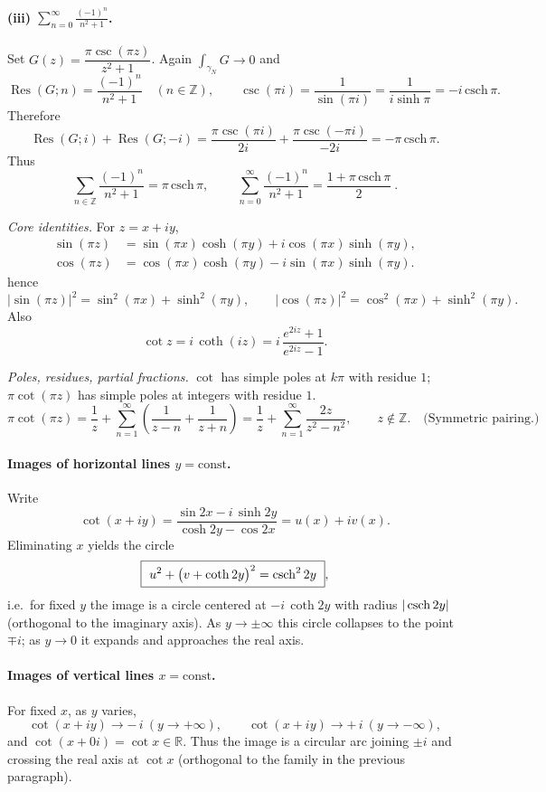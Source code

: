 \begin{problem}[CP-IV-0137]
\medskip
\paragraph{(iii) $\displaystyle \sum_{n=0}^{\infty}\frac{(-1)^{n}}{n^{2}+1}$.}
Set $G(z)=\dfrac{\pi\csc(\pi z)}{z^{2}+1}$.
Again $\int_{\gamma_N}G\to0$ and
\[
\operatorname{Res}(G;n)=\frac{(-1)^{n}}{n^{2}+1}\quad(n\in\mathbb Z),
\qquad
\csc(\pi i)=\frac{1}{\sin(\pi i)}=\frac{1}{i\sinh\pi}=-i\,\mathrm{csch}\,\pi.
\]
Therefore
\[
\operatorname{Res}(G;i)+\operatorname{Res}(G;-i)
=\frac{\pi\csc(\pi i)}{2i}+\frac{\pi\csc(-\pi i)}{-2i}
=-\pi\,\mathrm{csch}\,\pi.
\]
Thus
\[
\sum_{n\in\mathbb Z}\frac{(-1)^{n}}{n^{2}+1}
=\pi\,\mathrm{csch}\,\pi,
\qquad
\boxed{\ \sum_{n=0}^{\infty}\frac{(-1)^{n}}{n^{2}+1}
	=\frac{1+\pi\,\mathrm{csch}\,\pi}{2}\ }.
\]


\emph{Core identities.} For $z=x+iy$,
\[
\begin{aligned}
\sin(\pi z)&=\sin(\pi x)\cosh(\pi y)
+i\cos(\pi x)\sinh(\pi y),\\
\cos(\pi z)&=\cos(\pi x)\cosh(\pi y)
-i\sin(\pi x)\sinh(\pi y).
\end{aligned}
\]
hence
\[
|\sin(\pi z)|^2=\sin^2(\pi x)+\sinh^2(\pi y),\qquad
|\cos(\pi z)|^2=\cos^2(\pi x)+\sinh^2(\pi y).
\]
Also
\[
\cot z=i\,\coth(iz)=i\,\frac{e^{2iz}+1}{e^{2iz}-1}.
\]

\emph{Poles, residues, partial fractions.}
$\cot$ has simple poles at $k\pi$ with residue $1$; $\pi\cot(\pi z)$ has simple poles at integers with residue $1$.
\[
\pi\cot(\pi z)=\frac1z+\sum_{n=1}^{\infty}\left(\frac1{z-n}+\frac1{z+n}\right)=\frac1z+\sum_{n=1}^{\infty}\frac{2z}{z^2-n^2},\qquad z\notin\mathbb Z.\quad\text{(Symmetric pairing.)}
\]

\medskip
\paragraph{Images of horizontal lines $y=\text{const}$.}
Write
\[
\cot(x+iy)=\frac{\sin 2x - i\,\sinh 2y}{\cosh 2y - \cos 2x}=u(x)+iv(x).
\]
Eliminating $x$ yields the circle
\[
\boxed{\ u^2+\big(v+\operatorname{coth} 2y\big)^2=\operatorname{csch}^2 2y\ },
\]
i.e.\ for fixed $y$ the image is a circle centered at $-i\,\coth 2y$ with radius $|\operatorname{csch} 2y|$ (orthogonal to the imaginary axis). As $y\to\pm\infty$ this circle collapses to the point $\mp i$; as $y\to0$ it expands and approaches the real axis.

\medskip
\paragraph{Images of vertical lines $x=\text{const}$.}
For fixed $x$, as $y$ varies,
\[
\cot(x+iy)\to -\,i\ (y\to+\infty),\qquad \cot(x+iy)\to +\,i\ (y\to-\infty),
\]
and $\cot(x+0i)=\cot x\in\mathbb R$. Thus the image is a circular arc joining $\pm i$ and crossing the real axis at $\cot x$ (orthogonal to the family in the previous paragraph).


\end{problem}
